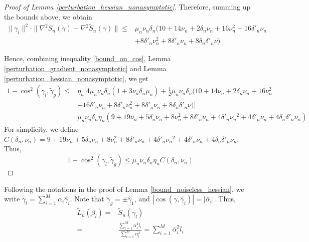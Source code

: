 \documentclass{article} \usepackage{iclr2019_conference,times}
\begin{document}
\begin{proof}[Proof of Lemma \ref{perturbation_hessian_nonasymptotic}]
Therefore, summing up the bounds above, we obtain
\begin{equation}
    \begin{split}
        \| \gamma_l \|^2 \cdot \|\nabla^2 S_n(\gamma) - \nabla^2 \tilde{S}_n(\gamma) \|
        \leq & \mu_n \nu_n \delta_n (10 + 14 \nu_n + 2 \delta_n \nu_n + 16 \nu_n^2 + 16 \delta'_n \nu_n \\ & + 8 \delta'_n \nu_n^2 + 8 \delta'_n \nu_n + 8 \delta_n \delta'_n \nu)
    \end{split}
\end{equation}


Hence, combining inequality \ref{bound_on_cos}, Lemma \ref{perturbation_gradient_nonasymptotic} and Lemma \ref{perturbation_hessian_nonasymptotic}, we get
\begin{equation}
    \begin{split}
        1-\cos^2(\gamma_l, \tilde{\gamma}_g) \leq & \eta_n [4 \mu_n \nu_n \delta_n (1 + 3 \nu_n \delta_n \mu_n) + \frac{1}{2}\mu_n \nu_n \delta_n (10 + 14 \nu_n + 2 \delta_n \nu_n + 16 \nu_n^2 \\ & + 16 \delta'_n \nu_n + 8 \delta'_n \nu_n^2 + 8 \delta'_n \nu_n + 8 \delta_n \delta'_n \nu)] \\
        = & \mu_n \nu_n \delta_n \eta_n ( 9 + 19 \nu_n + 5 \delta_n \nu_n + 8 \nu_n^2 + 8 \delta'_n \nu_n + 4 \delta'_n {\nu_n}^2 + 4 \delta'_n \nu_n + 4 \delta_n \delta'_n \nu_n)
    \end{split}
\end{equation}
For simplicity, we define $C(\delta_n, \nu_n) = 9 + 19 \nu_n + 5 \delta_n \nu_n + 8 \nu_n^2 + 8 \delta'_n \nu_n + 4 \delta'_n {\nu_n}^2 + 4 \delta'_n \nu_n + 4 \delta_n \delta'_n \nu_n$. \\
Thus, 
\begin{equation}
\label{bound_cos_2}
    1-\cos^2(\gamma_l, \tilde{\gamma}_g) \leq \mu_n \nu_n \delta_n \eta_n C(\delta_n, \nu_n)
\end{equation}




\end{proof}

Following the notations in the proof of Lemma \ref{bound_noiseless_hessian}, we write $\gamma_l = \sum_{i=1}^M \alpha_i \hat{\gamma}_i$. Note that $\tilde{\gamma}_g = \pm \hat{\gamma}_1$, and $|\cos(\gamma, \hat{\gamma}_i)| = |\bar{\alpha}_i|$. Thus, 
\begin{equation}
    \begin{split}
        \tilde{L}_n(\beta_l) =& \tilde{S}_n(\gamma_l) \\
        =& \frac{\sum_{i=1}^M \alpha_i^2 l_i}{\sum_{i=1}^M \alpha_i^2} 
        = \sum_{i=1}^M \bar{\alpha}_i^2 l_i
    \end{split}
\end{equation}
\end{document}
